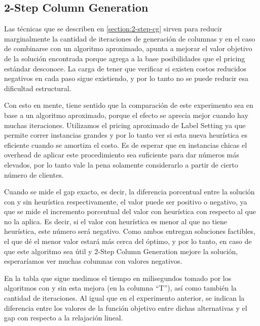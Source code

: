 \subsection{2-Step Column Generation}
\label{section:2-step-cg-testing}

Las técnicas que se describen en \ref{section:2-step-cg} sirven para reducir marginalmente la cantidad de iteraciones de generación de columnas y en el caso de combinarse con un algoritmo aproximado, apunta a mejorar el valor objetivo de la solución encontrada porque agrega a la base posibilidades que el pricing estándar desconoce. La carga de tener que verificar si existen costos reducidos negativos en cada paso sigue existiendo, y por lo tanto no se puede reducir esa dificultad estructural.

Con esto en mente, tiene sentido que la comparación de este experimento sea en base a un algoritmo aproximado, porque el efecto se aprecia mejor cuando hay muchas iteraciones. Utilizamos el pricing aproximado de Label Setting ya que permite correr instancias grandes y por lo tanto ver si esta nueva heurística es eficiente cuando se amortiza el costo. Es de esperar que en instancias chicas el overhead de aplicar este procedimiento sea suficiente para dar números más elevados, por lo tanto vale la pena solamente considerarlo a partir de cierto número de clientes. 

Cuando se mide el gap exacto, es decir, la diferencia porcentual entre la solución con y sin heurística respectivamente, el valor puede ser positivo o negativo, ya que se mide el incremento porcentual del valor con heurística con respecto al que no la aplica. Es decir, si el valor con heurística es menor al que no tiene heurística, este número será negativo. Como ambos entregan soluciones factibles, el que dé el menor valor estará más cerca del óptimo, y por lo tanto, en caso de que este algoritmo sea útil y 2-Step Column Generation mejore la solución, esperaríamos ver muchas columnas con valores negativos.

En la tabla que sigue medimos el tiempo en milisegundos tomado por los algoritmos con y sin esta mejora (en la columna ``T''), así como también la cantidad de iteraciones. Al igual que en el experimento anterior, se indican la diferencia entre los valores de la función objetivo entre dichas alternativas y el gap con respecto a la relajación lineal. 



